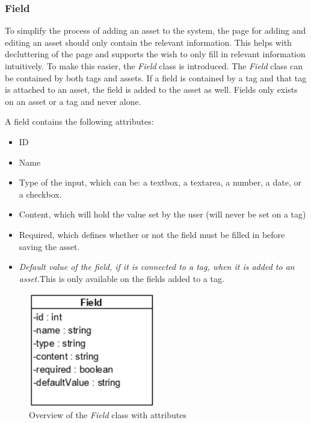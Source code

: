 \subsubsection{Field}
To simplify the process of adding an asset to the system, the page for adding and editing an asset should only contain the relevant information. This helps with decluttering of the page and supports the wish to only fill in relevant information intuitively. To make this easier, the \textit{Field} class is introduced. The \textit{Field} class can be contained by both tags and assets. If a field is contained by a tag and that tag is attached to an asset, the field is added to the asset as well. Fields only exists on an asset or a tag and never alone.
\par
A field contains the following attributes:
\begin{itemize}
    \item ID
    \item Name
    \item Type of the input, which can be: a textbox, a textarea, a number, a date, or a checkbox. 
    \item Content, which will hold the value set by the user (will never be set on a tag)
    \item Required, which defines whether or not the field must be filled in before saving the asset.
    \item \textit{Default value of the field, if it is connected to a tag, when it is added to an asset.}\newline This is only available on the fields added to a tag.
\end{itemize}
\begin{figure}[H]
    \centering
    \includegraphics[width=0.5\textwidth]{figures/Classes/FieldAttributes.png}
    \caption{Overview of the \textit{Field} class with attributes}
    \label{fig:FieldWithAttributes}
\end{figure}

